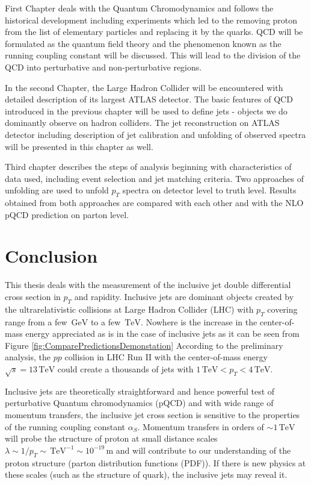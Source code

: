 \documentclass[a4paper,11pt,twoside,openright]{book}
\newcommand{\TeV}{\,\text{TeV}}
\newcommand{\GeV}{\,\text{GeV}}
\newcommand{\pt}{p_{T}}
\begin{document}
First Chapter deals with the Quantum Chromodynamics and follows the historical
development including experiments which led to the removing proton from the list
of elementary particles and replacing it by the quarks. QCD will be formulated
as the quantum field theory and the phenomenon known as the running coupling
constant will be discussed. This will lead to the division of the QCD into
perturbative and non-perturbative regions.

In the second Chapter, the Large Hadron Collider will be encountered with
detailed description of its largest ATLAS detector. The basic features of QCD
introduced in the previous chapter will be used to define jets - objects we do
dominantly observe on hadron colliders. The jet reconstruction on ATLAS detector
including description of jet calibration and unfolding of observed spectra will
be presented in this chapter as well.

Third chapter describes the steps of analysis beginning with characteristics of
data used, including event selection and jet matching criteria. Two approaches
of unfolding are used to unfold $\pt$ spectra on detector level to truth level.
Results obtained from both approaches are compared with each other and with the
NLO pQCD prediction on parton level.






\chapter*{Conclusion}

This thesis deals with the measurement of the inclusive jet double differential
cross section in $\pt$ and rapidity. Inclusive jets are dominant objects created
by the ultrarelativistic collisions at Large Hadron Collider (LHC) with $\pt$
covering range from a few $\GeV$ to a few $\TeV$. Nowhere is the increase in the
center-of-mass energy appreciated as is in the case of inclusive jets as it can
be seen from Figure \ref{fig:ComparePredictionsDemonstation}  According to the
preliminary analysis, the $pp$ collision in LHC Run II with the center-of-mass
energy $\sqrt{s} = 13\TeV$ could create a thousands of jets with $1\TeV < \pt <
4\TeV$.

Inclusive jets are theoretically straightforward and hence powerful test of
perturbative Quantum chromodynamics (pQCD) and with wide range of 
momentum transfers, the inclusive jet cross section is sensitive to the
properties of the running coupling constant $\alpha_S$.  Momentum transfers in
orders of $\sim 1 \TeV$ will probe the structure of proton at small distance
scales $\lambda \sim 1 / \pt \sim \TeV^{-1} \sim 10^{-19} \, \text{m}$ and will
contribute to our understanding of the proton structure (parton distribution
functions (PDF)). If there is new physics at these scales (such as the
structure of quark), the inclusive jets may reveal it.
\end{document}
